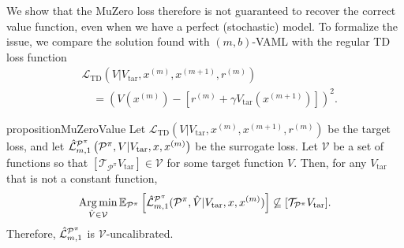 We show that the MuZero loss therefore is not guaranteed to recover the correct value function, even when we have a perfect (stochastic) model.
To formalize the issue, we compare the solution found with $(m,b)$-VAML with the regular TD loss function
\begin{align}
    &\mathcal{L}_\mathrm{TD}(V|V_\mathrm{tar}, x^{(m)},x^{(m+1)},r^{(m)}) \nonumber\\
    &\quad=\left(V(x^{(m)}) - \left[r^{(m)} + \gamma V_\mathrm{tar}(x^{(m+1)})\right]\right)^2.
\end{align}

\begin{restatable}{proposition}{MuZeroValue}\label{prop:cvaml:2_3}
    Let $\mathcal{L}_\mathrm{TD}(V|V_\mathrm{tar}, x^{(m)},x^{(m+1)},r^{(m)})$ be the target loss, and let $\hat{\mathcal{L}}^{\P^\pi}_{m,1}\left(\P^\pi,V| V_\mathrm{tar},x, x^{(m)}\right)$ be the surrogate loss. 
    Let $\mathcal{V}$ be a set of functions so that $[\mathcal{T}_{\mathcal{P}^\pi}V_\mathrm{tar}] \in \mathcal{V}$ for some target function $V$.
    Then, for any $V_\mathrm{tar}$ that is not a constant function, $$ \Argmin_{\hat{V} \in \mathcal{V}} \mathbb{E}_{\P^\pi}\squareb{\hat{\mathcal{L}}^{\P^\pi}_{m,1}(\P^\pi, \hat{V}| V_\mathrm{tar}, x, x^{(m)})} \not \subseteq [\mathcal{T}_{\P^\pi} V_\mathrm{tar}].$$
    Therefore, $\hat{\mathcal{L}}^{\P^\pi}_{m,1}$ is $\mathcal{V}$-uncalibrated.
\end{restatable}
